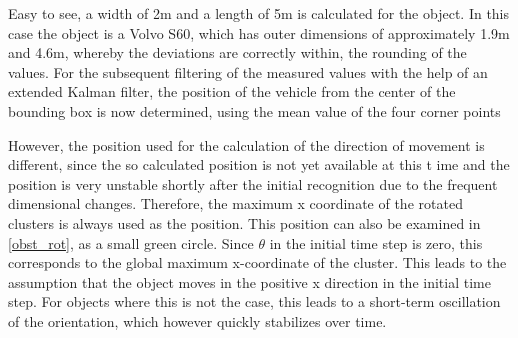 \documentclass[11pt,oneside,openright]{mpreport}
\begin{document}
Easy to see, a width of 2m and a length of 5m is calculated for the object. In this case the object is a Volvo S60, which has outer dimensions of approximately
1.9m and 4.6m, whereby the deviations are correctly within, the rounding of the values. For the subsequent filtering of the measured values with the help of an extended Kalman filter, 
the position of the vehicle from the center of the bounding box is now determined, using the mean value of the four corner points


However, the position used for the calculation of the direction of movement is different, since the so calculated position is not yet available at this t
ime and the position is very unstable shortly after the initial recognition due to the frequent dimensional changes. Therefore, the maximum x coordinate
of the rotated clusters is always used as the position. This position can also be examined in \cref{obst_rot}, as a small green circle. Since $\theta$ in the initial time step is zero, 
this corresponds to the global maximum x-coordinate of the cluster. This leads to the assumption that the object moves in the positive x direction in the initial time step. 
For objects where this is not the case, this leads to a short-term oscillation of the orientation, which however quickly stabilizes over time.

\end{document}
